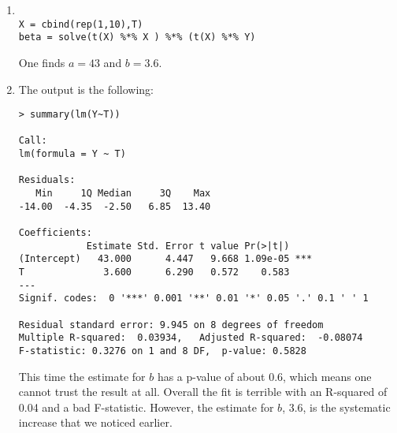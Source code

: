 \documentclass[a4paper,11pt]{article}
\begin{document}
\begin{enumerate}
\item
\begin{verbatim}

X = cbind(rep(1,10),T)
beta = solve(t(X) %*% X ) %*% (t(X) %*% Y)
\end{verbatim}
One finds $a=43$ and $b=3.6$.

\item The output is the following:
\begin{verbatim}
> summary(lm(Y~T))

Call:
lm(formula = Y ~ T)

Residuals:
   Min     1Q Median     3Q    Max
-14.00  -4.35  -2.50   6.85  13.40

Coefficients:
            Estimate Std. Error t value Pr(>|t|)
(Intercept)   43.000      4.447   9.668 1.09e-05 ***
T              3.600      6.290   0.572    0.583
---
Signif. codes:  0 '***' 0.001 '**' 0.01 '*' 0.05 '.' 0.1 ' ' 1

Residual standard error: 9.945 on 8 degrees of freedom
Multiple R-squared:  0.03934,	Adjusted R-squared:  -0.08074
F-statistic: 0.3276 on 1 and 8 DF,  p-value: 0.5828
\end{verbatim}
This time the estimate for $b$ has a p-value of about 0.6, which means one cannot
trust the result at all. Overall the fit is terrible with an R-squared of 0.04 and a bad F-statistic.
However, the estimate for $b$, 3.6, is the systematic increase that we noticed earlier.

\end{enumerate}
\end{document}
